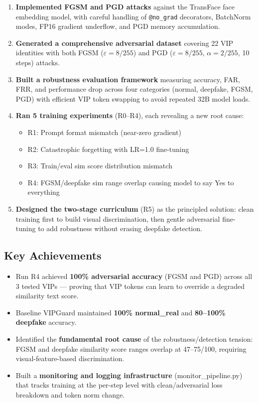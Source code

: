 \documentclass[12pt,a4paper]{article}
\begin{document}
\begin{enumerate}
    \item \textbf{Implemented FGSM and PGD attacks} against the TransFace face embedding model, with careful handling of \texttt{@no\_grad} decorators, BatchNorm modes, FP16 gradient underflow, and PGD memory accumulation.

    \item \textbf{Generated a comprehensive adversarial dataset} covering 22 VIP identities with both FGSM ($\varepsilon = 8/255$) and PGD ($\varepsilon = 8/255$, $\alpha = 2/255$, 10 steps) attacks.

    \item \textbf{Built a robustness evaluation framework} measuring accuracy, FAR, FRR, and performance drop across four categories (normal, deepfake, FGSM, PGD) with efficient VIP token swapping to avoid repeated 32B model loads.

    \item \textbf{Ran 5 training experiments} (R0--R4), each revealing a new root cause:
    \begin{itemize}
        \item R1: Prompt format mismatch (near-zero gradient)
        \item R2: Catastrophic forgetting with LR=1.0 fine-tuning
        \item R3: Train/eval sim score distribution mismatch
        \item R4: FGSM/deepfake sim range overlap causing model to say Yes to everything
    \end{itemize}

    \item \textbf{Designed the two-stage curriculum} (R5) as the principled solution: clean training first to build visual discrimination, then gentle adversarial fine-tuning to add robustness without erasing deepfake detection.
\end{enumerate}

\subsection{Key Achievements}

\begin{itemize}
    \item Run R4 achieved \textbf{100\% adversarial accuracy} (FGSM and PGD) across all 3 tested VIPs --- proving that VIP tokens can learn to override a degraded similarity text score.
    \item Baseline VIPGuard maintained \textbf{100\% normal\_real} and \textbf{80--100\% deepfake} accuracy.
    \item Identified the \textbf{fundamental root cause} of the robustness/detection tension: FGSM and deepfake similarity score ranges overlap at 47--75/100, requiring visual-feature-based discrimination.
    \item Built a \textbf{monitoring and logging infrastructure} (monitor\_pipeline.py) that tracks training at the per-step level with clean/adversarial loss breakdown and token norm change.
\end{itemize}
\end{document}
